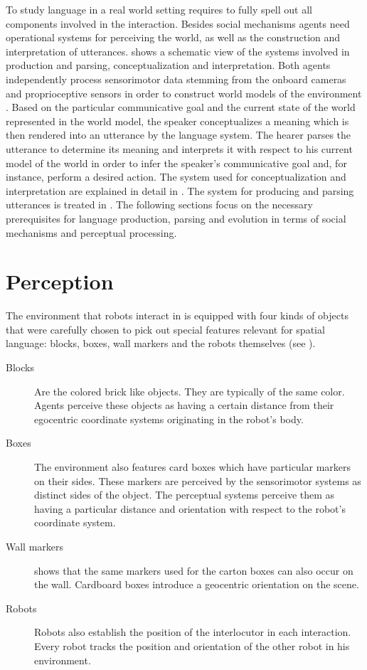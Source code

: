 To study language in a real world  setting requires to fully spell out 
all components involved in the interaction.
Besides social mechanisms agents need operational systems for perceiving
the world, as well as the construction and interpretation of utterances. 
 shows a schematic view of the systems
involved in production and parsing, conceptualization and interpretation. 
Both agents independently process sensorimotor data stemming from
the onboard cameras and proprioceptive sensors in order to construct 
world models of the environment 
\citep{spranger2008grounded,spranger2012perception}. 
Based on the particular communicative goal and the current state of the 
world represented in the world model, the speaker conceptualizes a meaning 
which is then rendered into an utterance by the language system. 
The hearer parses the utterance to determine its meaning and 
interprets it with respect to his current model of the world in order 
to infer the speaker's communicative goal and, for instance, 
perform a desired action. The system used for conceptualization
and interpretation are explained in detail in .
The system for producing and parsing utterances is treated in
. 
The following sections focus on the necessary prerequisites for 
language production, parsing and evolution in terms of social mechanisms and 
perceptual processing.

\section{Perception}
\label{s:perception}
The environment that robots interact in is equipped with four kinds of objects
that were carefully chosen to pick out special features relevant for spatial language:
blocks, boxes, wall markers and the robots themselves 
(see ). 
\begin{description}
\item[Blocks] Are the colored brick like objects. They are typically of the same color.
Agents perceive these objects as having a certain distance from their 
egocentric coordinate systems originating in the robot's body.
\item[Boxes] The environment also features card boxes which have 
particular markers on their sides. These markers are perceived by the sensorimotor 
systems as distinct sides of the object. The perceptual systems
perceive them as having a particular distance and orientation with
respect to the robot's coordinate system. 
\item[Wall markers]  shows that the same markers
used for the carton boxes can also occur on the wall.
Cardboard boxes introduce a geocentric orientation on the scene.
\item[Robots] Robots also establish the position of the interlocutor in
each interaction. Every robot tracks the position and orientation of the
other robot in his environment.
\end{description}

